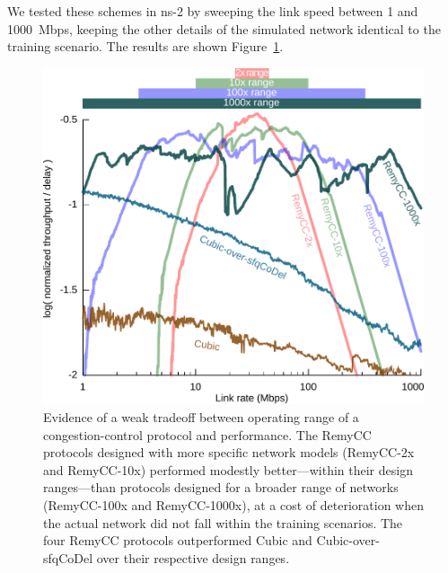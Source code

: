 We tested these schemes in ns-2 by sweeping the link speed between 1
and 1000~Mbps, keeping the other details of the simulated network
identical to the training scenario. The results are shown Figure~\ref{fig:breadth}.

\begin{figure}
\centering
\includegraphics[width=\columnwidth]{oprange-manual.pdf}
\caption{Evidence of a weak tradeoff between operating range of a
  congestion-control protocol and performance. The RemyCC protocols
  designed with more specific network models (RemyCC-2x and RemyCC-10x)
  performed modestly better---within their design ranges---than protocols
  designed for a broader range of networks (RemyCC-100x and RemyCC-1000x),
  at a cost of deterioration when the actual network did not fall
  within the training scenarios. The four RemyCC protocols outperformed
  Cubic and Cubic-over-sfqCoDel over their respective design ranges.}
\label{fig:breadth}
\end{figure}

